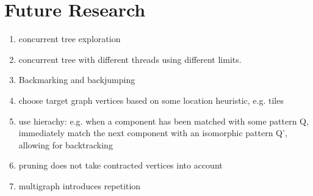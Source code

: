\chapter{Future Research}

\begin{enumerate}
\item concurrent tree exploration
\item concurrent tree with different threads using different limits.
\item Backmarking and backjumping
\item choose target graph vertices based on some location heuristic, e.g. tiles
\item use hierachy: e.g. when a component has been matched with some pattern Q, immediately match the next component with an isomorphic pattern Q', allowing for backtracking
\item pruning does not take contracted vertices into account
\item multigraph introduces repetition

\end{enumerate}